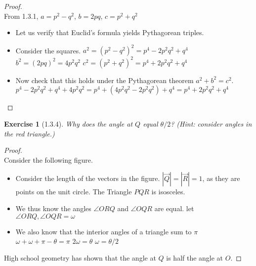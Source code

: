 \documentclass[10pt]{article}
\theoremstyle{plain}
\newtheorem{ex}{Exercise}
\begin{document}
\begin{proof}
  \ \\
  From 1.3.1, $a=p^{2}-q^{2}$, $b=2pq$, $c=p^2+q^{2}$
  \begin{itemize}
    \item Let us verify that Euclid's formula yields Pythagorean triples.
    \item Consider the squares. 
    \subitem $a^{2}=(p^{2}-q^{2})^{2}=p^{4}-2p^{2}q^{2}+q^{4}$
    \subitem $b^{2}=(2pq)^{2}=4p^{2}q^{2}$
    \subitem $c^{2}=(p^2+q^{2})^{2}=p^{4}+2p^{2}q^{2}+q^{4}$
    \item Now check that this holds under the Pythagorean theorem $a^{2}+b^{2}=c^{2}$.
    \subitem $p^{4}-2p^{2}q^{2}+q^{4}+4p^{2}q^{2}=p^{4}+(4p^{2}q^{2}-2p^{2}q^{2})+q^{4}=p^{4}+2p^{2}q^{2}+q^{4}$
  \end{itemize}
\end{proof}

\hrulefill

\begin{ex} [1.3.4]
  Why does the angle at $Q$ equal $\theta/2$? (Hint: consider angles in the red triangle.)
\end{ex}

\begin{proof}
  \ \\
  Consider the following figure. \\
  \begin{center}
  \end{center}
  \begin{itemize}
    \item Consider the length of the vectors in the figure.
    \subitem $|\overrightarrow{Q}| = |\overrightarrow{R}| = 1 $, as they are points on the unit circle.
    \subitem The Triangle $PQR$ is isosceles.
    \item We thus know the angles $\angle ORQ$ and $\angle OQR$ are equal.
    \subitem let $\angle ORQ, \angle OQR = \omega $
    \item We also know that the interior angles of a triangle sum to $\pi$
    \subitem $\omega + \omega + \pi - \theta = \pi$
    \subitem $2\omega = \theta$
    \subitem $\omega = \theta/2$
  \end{itemize}
  High school geometry has shown that the angle at $Q$ is half the angle at $O$.
\end{proof}
\end{document}
